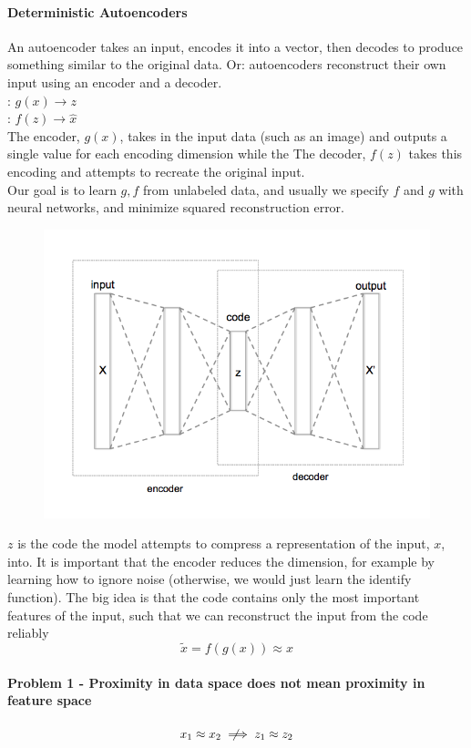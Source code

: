 \documentclass[11pt]{article}
\begin{document}
\paragraph{Deterministic Autoencoders}
An autoencoder takes an input, encodes it into a vector, then decodes to produce something similar to the original data. Or: autoencoders reconstruct their own input using an encoder and a decoder. \\
: $g(x) \rightarrow z$\\
: $f(z) \rightarrow \hat{x}$\\
The encoder, $g(x)$, takes in the input data (such as an image) and outputs a single value for each encoding dimension while the The decoder, $f(z)$ takes this encoding and attempts to recreate the original input.\\
Our goal is to learn $g, f$ from unlabeled data, and usually we specify $f$ and $g$ with neural networks, and minimize squared reconstruction error.
\begin{figure}[H]
	\centering
	\includegraphics[scale=0.6]{p13.png}
\end{figure}
\noindent $z$ is the code the model attempts to compress a representation of the input, $x$, into.
It is important that the encoder reduces the dimension, for example by learning how to ignore noise (otherwise, we would just learn the identify function). The big idea is that the code contains only the most important features of the input, such that we can reconstruct the input from the code reliably
$$\tilde{x} = f(g(x)) \approx x$$

\paragraph{Problem 1 - Proximity in data space does not mean proximity in feature space}
$$x_1 \approx x_2 \notimplies z_1 \approx z_2$$
\end{document}
